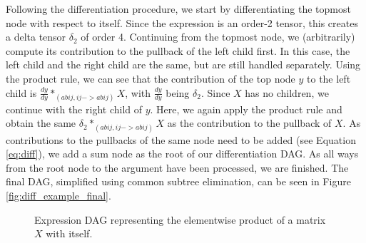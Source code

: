 \documentclass[12pt, a4paper]{report}
\begin{document}
Following the differentiation procedure, we start by differentiating the topmost node with respect to itself.
Since the expression is an order-2 tensor, this creates a delta tensor $\delta_2$ of order 4.
Continuing from the topmost node, we (arbitrarily) compute its contribution to the pullback of the left child first.
In this case, the left child and the right child are the same, but are still handled separately.
Using the product rule, we can see that the contribution of the top node $y$ to the left child is $\frac{dy}{dy} *_{(abij,ij->abij)} X$, with $\frac{dy}{dy}$ being $\delta_2$.
Since $X$ has no children, we continue with the right child of $y$.
Here, we again apply the product rule and obtain the same $\delta_2 *_{(abij,ij->abij)} X$ as the contribution to the pullback of $X$.
As contributions to the pullbacks of the same node need to be added (see Equation \ref{eq:diff}), we add a sum node as the root of our differentiation DAG.
As all ways from the root node to the argument have been processed, we are finished.
The final DAG, simplified using common subtree elimination, can be seen in Figure \ref{fig:diff_example_final}.

\begin{figure}
    \centering
    \caption{Expression DAG representing the elementwise product of a matrix $X$ with itself.}
    \label{fig:diff_example_original}
\end{figure}
\end{document}
